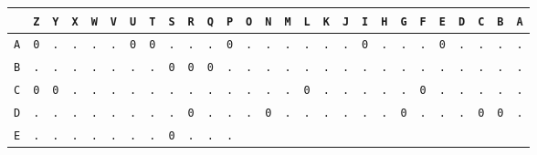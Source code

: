 \begin{figure}[H]
	\begin{center}
		\scalebox{0.5} {
			\begin{tabular}{c|cccccccccccccccccccccccccc}
				           & \texttt{Z} & \texttt{Y} & \texttt{X} & \texttt{W} &
				\texttt{V} & \texttt{U} & \texttt{T} & \texttt{S} &
				\texttt{R} & \texttt{Q} & \texttt{P} & \texttt{O} &
				\texttt{N} & \texttt{M} & \texttt{L} & \texttt{K} &
				\texttt{J} & \texttt{I} & \texttt{H} & \texttt{G} &
				\texttt{F} & \texttt{E} & \texttt{D} & \texttt{C} &
				\texttt{B} & \texttt{A}
				\\ \hline
				\texttt{A} & \texttt{0} & \texttt{.} & \texttt{.} &
				\texttt{.} & \texttt{.} & \texttt{0} & \texttt{0} &
				\texttt{.} & \texttt{.} & \texttt{.} & \texttt{0} &
				\texttt{.} & \texttt{.} & \texttt{.} & \texttt{.} &
				\texttt{.} & \texttt{.} & \texttt{0} & \texttt{.} &
				\texttt{.} & \texttt{.} & \texttt{0} & \texttt{.} &
				\texttt{.} & \texttt{.} & \texttt{.}                             \\
				\texttt{B} & \texttt{.} & \texttt{.} & \texttt{.} &
				\texttt{.} & \texttt{.} & \texttt{.} & \texttt{.} &
				\texttt{0} & \texttt{0} & \texttt{0} & \texttt{.} &
				\texttt{.} & \texttt{.} & \texttt{.} & \texttt{.} &
				\texttt{.} & \texttt{.} & \texttt{.} & \texttt{.} &
				\texttt{.} & \texttt{.} & \texttt{.} & \texttt{.} &
				\texttt{.} & \texttt{.} & \texttt{.}                             \\
				\texttt{C} & \texttt{0} & \texttt{0} & \texttt{.} &
				\texttt{.} & \texttt{.} & \texttt{.} & \texttt{.} &
				\texttt{.} & \texttt{.} & \texttt{.} & \texttt{.} &
				\texttt{.} & \texttt{.} & \texttt{.} & \texttt{0} &
				\texttt{.} & \texttt{.} & \texttt{.} & \texttt{.} &
				\texttt{.} & \texttt{0} & \texttt{.} & \texttt{.} &
				\texttt{.} & \texttt{.} & \texttt{.}                             \\
				\texttt{D} & \texttt{.} & \texttt{.} & \texttt{.} &
				\texttt{.} & \texttt{.} & \texttt{.} & \texttt{.} &
				\texttt{.} & \texttt{0} & \texttt{.} & \texttt{.} &
				\texttt{.} & \texttt{0} & \texttt{.} & \texttt{.} &
				\texttt{.} & \texttt{.} & \texttt{.} & \texttt{.} &
				\texttt{0} & \texttt{.} & \texttt{.} & \texttt{.} &
				\texttt{0} & \texttt{0} & \texttt{.}                             \\
				\texttt{E} & \texttt{.} & \texttt{.} & \texttt{.} &
				\texttt{.} & \texttt{.} & \texttt{.} & \texttt{.} &
				\texttt{0} & \texttt{.} & \texttt{.} & \texttt{.} &

\end{tabular}}
\end{center}
\end{figure}
